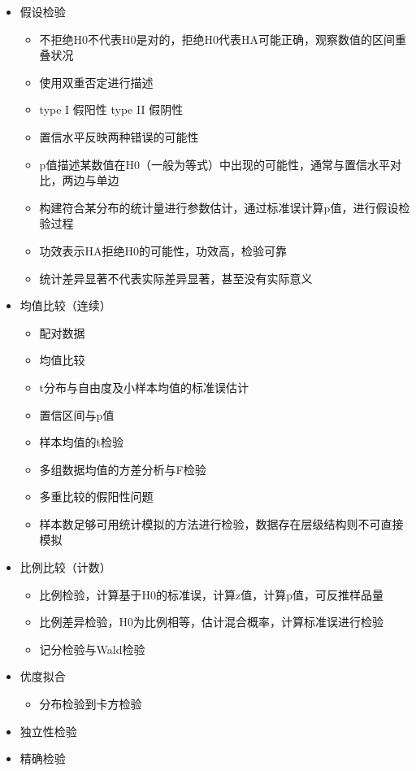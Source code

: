 \documentclass[]{book}
\providecommand{\tightlist}{%
  \setlength{\itemsep}{0pt}\setlength{\parskip}{0pt}}
\begin{document}
\begin{itemize}
\item
  假设检验

  \begin{itemize}
  \tightlist
  \item
    不拒绝H0不代表H0是对的，拒绝H0代表HA可能正确，观察数值的区间重叠状况
  \item
    使用双重否定进行描述
  \item
    type I 假阳性 type II 假阴性
  \item
    置信水平反映两种错误的可能性
  \item
    p值描述某数值在H0（一般为等式）中出现的可能性，通常与置信水平对比，两边与单边
  \item
    构建符合某分布的统计量进行参数估计，通过标准误计算p值，进行假设检验过程
  \item
    功效表示HA拒绝H0的可能性，功效高，检验可靠
  \item
    统计差异显著不代表实际差异显著，甚至没有实际意义
  \end{itemize}
\item
  均值比较（连续）

  \begin{itemize}
  \tightlist
  \item
    配对数据
  \item
    均值比较
  \item
    t分布与自由度及小样本均值的标准误估计
  \item
    置信区间与p值
  \item
    样本均值的t检验
  \item
    多组数据均值的方差分析与F检验
  \item
    多重比较的假阳性问题
  \item
    样本数足够可用统计模拟的方法进行检验，数据存在层级结构则不可直接模拟
  \end{itemize}
\item
  比例比较（计数）

  \begin{itemize}
  \tightlist
  \item
    比例检验，计算基于H0的标准误，计算z值，计算p值，可反推样品量
  \item
    比例差异检验，H0为比例相等，估计混合概率，计算标准误进行检验
  \item
    记分检验与Wald检验
  \end{itemize}
\item
  优度拟合

  \begin{itemize}
  \tightlist
  \item
    分布检验到卡方检验
  \end{itemize}
\item
  独立性检验
\item
  精确检验
\end{itemize}
\end{document}

